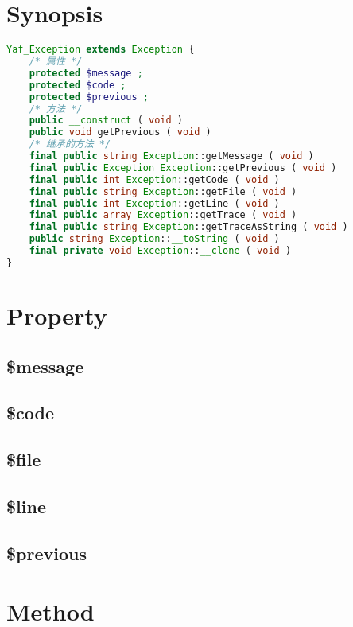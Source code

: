 \section{Synopsis}


\begin{lstlisting}[language=PHP]
Yaf_Exception extends Exception {
    /* 属性 */
    protected $message ;
    protected $code ;
    protected $previous ;
    /* 方法 */
    public __construct ( void )
    public void getPrevious ( void )
    /* 继承的方法 */
    final public string Exception::getMessage ( void )
    final public Exception Exception::getPrevious ( void )
    final public int Exception::getCode ( void )
    final public string Exception::getFile ( void )
    final public int Exception::getLine ( void )
    final public array Exception::getTrace ( void )
    final public string Exception::getTraceAsString ( void )
    public string Exception::__toString ( void )
    final private void Exception::__clone ( void )
}
\end{lstlisting}

\section{Property}


\subsection{\$message}


\subsection{\$code}


\subsection{\$file}


\subsection{\$line}


\subsection{\$previous}



\section{Method}


